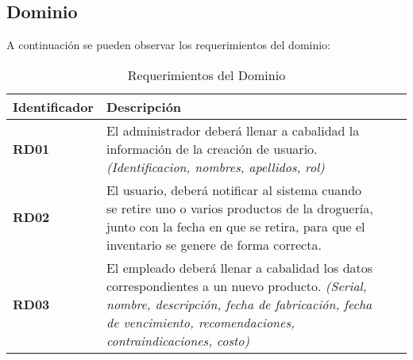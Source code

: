 \subsection{Dominio}
A continuación se pueden observar los requerimientos del dominio: \\
\begin{table}[h!]
	\begin{center}
		\begin{tabular}{| l |p{10cm} | l |p{30cm}|} 
			\hline
			\textbf{Identificador} & \textbf{Descripci\'on} \\
			\hline
			\textbf{RD01} & El administrador deberá llenar a cabalidad la información de la creación de usuario. \textit{(Identificacion,  nombres, apellidos, rol)}\\ \hline
			\textbf{RD02} & El usuario, deberá notificar al sistema cuando se retire uno o varios productos de la droguería, junto con la fecha en que se retira, para que el inventario se genere de forma correcta.\\ \hline
			\textbf{RD03} & El empleado deberá llenar a cabalidad los datos correspondientes a un nuevo producto. \textit{(Serial, nombre, descripción, fecha de fabricación, fecha de vencimiento, recomendaciones, contraindicaciones, costo)}\\ \hline
		\end{tabular}
		\caption{Requerimientos del Dominio}
		\label{reqDom}
	\end{center}
\end{table}

\newpage
